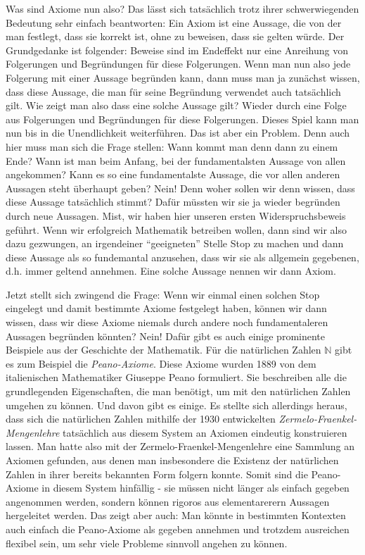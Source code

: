 Was sind Axiome nun also? Das lässt sich tatsächlich trotz ihrer schwerwiegenden Bedeutung sehr einfach beantworten: Ein Axiom ist eine Aussage, die von der man festlegt, dass sie korrekt ist, ohne zu beweisen, dass sie gelten würde. Der Grundgedanke ist folgender: Beweise sind im Endeffekt nur eine Anreihung von Folgerungen und Begründungen für diese Folgerungen. Wenn man nun also jede Folgerung mit einer Aussage begründen kann, dann muss man ja zunächst wissen, dass diese Aussage, die man für seine Begründung verwendet auch tatsächlich gilt. Wie zeigt man also dass eine solche Aussage gilt? Wieder durch eine Folge aus Folgerungen und Begründungen für diese Folgerungen. Dieses Spiel kann man nun bis in die Unendlichkeit weiterführen. Das ist aber ein Problem. Denn auch hier muss man sich die Frage stellen: Wann kommt man denn dann zu einem Ende? Wann ist man beim Anfang, bei der fundamentalsten Aussage von allen angekommen? Kann es so eine fundamentalste Aussage, die vor allen anderen Aussagen steht überhaupt geben? Nein! Denn woher sollen wir denn wissen, dass diese Aussage tatsächlich stimmt? Dafür müssten wir sie ja wieder begründen durch neue Aussagen. Mist, wir haben hier unseren ersten Widerspruchsbeweis geführt. Wenn wir erfolgreich Mathematik betreiben wollen, dann sind wir also dazu gezwungen, an irgendeiner "`geeigneten"' Stelle Stop zu machen und dann diese Aussage als so fundemantal anzusehen, dass wir sie als allgemein gegebenen, d.h. immer geltend annehmen. Eine solche Aussage nennen wir dann Axiom. 

Jetzt stellt sich zwingend die Frage: Wenn wir einmal einen solchen Stop eingelegt und damit bestimmte Axiome festgelegt haben, können wir dann wissen, dass wir diese Axiome niemals durch andere noch fundamentaleren Aussagen begründen könnten? Nein! Dafür gibt es auch einige prominente Beispiele aus der Geschichte der Mathematik. Für die natürlichen Zahlen \(\mathbb N\) gibt es zum Beispiel die \textit{Peano-Axiome}. Diese Axiome wurden 1889 von dem italienischen Mathematiker Giuseppe Peano formuliert. Sie beschreiben alle die grundlegenden Eigenschaften, die man benötigt, um mit den natürlichen Zahlen umgehen zu können. Und davon gibt es einige. Es stellte sich allerdings heraus, dass sich die natürlichen Zahlen mithilfe der 1930 entwickelten \textit{Zermelo-Fraenkel-Mengenlehre} tatsächlich aus diesem System an Axiomen eindeutig konstruieren lassen. Man hatte also mit der Zermelo-Fraenkel-Mengenlehre eine Sammlung an Axiomen gefunden, aus denen man insbesondere die Existenz der natürlichen Zahlen in ihrer bereits bekannten Form folgern konnte. Somit sind die Peano-Axiome in diesem System hinfällig - sie müssen nicht länger als einfach gegeben angenommen werden, sondern können rigoros aus elementarerern Aussagen hergeleitet werden. Das zeigt aber auch: Man könnte in bestimmten Kontexten auch einfach die Peano-Axiome als gegeben annehmen und trotzdem ausreichen flexibel sein, um sehr viele Probleme sinnvoll angehen zu können. 

